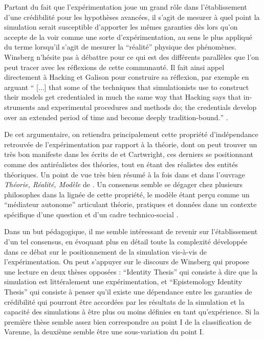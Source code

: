 Partant du fait que l'expérimentation joue un grand rôle dans l'établissement d'une crédibilité pour les hypothèses avancées, il s'agit de mesurer à quel point la simulation serait susceptible d'apporter les mêmes garanties dès lors qu'on accepte de la voir comme une sorte d'expérimentation, au sens le plus appliqué du terme lorsqu'il s'agit de mesurer la \enquote{réalité} physique des phénomènes. Winsberg n'hésite pas à débattre pour ce qui est des différents parallèles que l'on peut tracer avec les réflexions de cette communauté. Il fait ainsi appel directement à Hacking et Galison pour construire sa réflexion, par exemple en arguant \foreignquote{english}{ [...] that some of the techniques that simulationists use to construct their models get credentialed in much the same way that Hacking says that instruments and experimental procedures and methods do; the credentials develop over an extended period of time and become deeply tradition-bound.} \autocites{Winsberg2003, Winsberg2013}.

De cet argumentaire, on retiendra principalement cette propriété d'indépendance retrouvée de l'expérimentation par rapport à la théorie, dont on peut trouver un très bon manifeste dans les écrits de \textcite{Hacking1989} et Cartwright, ces derniers se positionnant comme des antiréalistes des théories, tout en étant des réalistes des entités théoriques. Un point de vue très bien résumé à la fois dans \textcite{Hacking1989} et dans l'ouvrage \textit{Théorie, Réalité, Modèle} de \textcite[226-231]{Varenne2012}. Un consensus semble se dégager chez plusieurs philosophes \autocites{Morgan2009, Varenne2001, Varenne2013b} dans la lignée de cette propriété, le modèle étant perçu comme un \enquote{médiateur autonome} articulant théorie, pratiques et données dans un contexte spécifique d'une question et d'un cadre technico-social \autocite[2]{Phan2010}.

Dans un but pédagogique, il me semble intéressant de revenir sur l'établissement d'un tel consensus, en évoquant plus en détail toute la complexité développée dans ce débat sur le positionnement de la simulation vis-à-vis de l'expérimentation. On peut s'appuyer sur le discours de Winsberg qui propose une lecture en deux thèses opposées : \foreignquote{english}{Identity Thesis} qui consiste à dire que la simulation est littéralement une expérimentation, et \foreignquote{english}{Epistemology Identity Thesis} qui consiste à penser qu'il existe une dépendance entre les garanties de crédibilité qui pourront être accordées par les résultats de la simulation et la capacité des simulations à être plus ou moins définies en tant qu'expérience. Si la première thèse semble assez bien correspondre au point I de la classification de Varenne, la deuxième semble être une sous-variation du point I.

